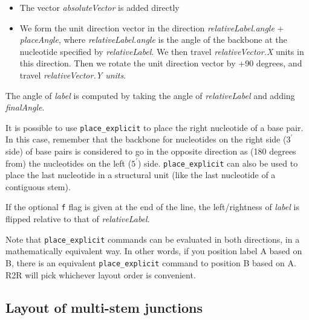 \documentclass[letterpaper,12pt]{report}
\newcommand{\comment}[1]{}
\begin{document}
\begin{itemize}
\item The vector \textit{absoluteVector} is added directly
\item We form the unit direction vector in the direction
\textit{relativeLabel.angle }+ \textit{placeAngle}, where
\textit{relativeLabel.angle }is the angle of the backbone at the
nucleotide specified by \textit{relativeLabel}.  We then travel
\textit{relativeVector.X} units in this direction.  Then we rotate the
unit direction vector by +90 degrees, and travel
\textit{relativeVector.Y units}.
\end{itemize}

The angle of \textit{label }is computed by taking the angle of
\textit{relativeLabel} and adding \textit{finalAngle}.

It is possible to use {\tt place\_explicit} to place the right nucleotide of a
base pair.  In this case, remember that the backbone for nucleotides on the right side
($3^\prime$ side) of base pairs is considered to go in the opposite direction as (180
degrees from) the nucleotides on the left ($5^\prime$) side.
{\tt place\_explicit} can also be used to place the last nucleotide in a
structural unit (like the last nucleotide of a contiguous stem).

If the optional {\tt f} flag is given at the end of the line, the
left/rightness of \textit{label} is flipped relative to that of {\it relativeLabel}.

Note that {\tt place\_explicit} commands can be evaluated in both directions,
in a mathematically equivalent way.  In other words, if you position label A based on B,
there is an equivalent {\tt place\_explicit} command to position B based on A.
R2R will pick whichever layout order is convenient.

\comment{
\subsubsection{Nudging points over a bit}
{\tt offset\_pt} \textit{label  relativeVector.X relativeVector.Y}

\begin{itemize}
\item[] adds the given X and Y coordinates to what would otherwise be
the coordinates of the point \textit{label}.
\end{itemize}
}
\subsection{Layout of multi-stem junctions}
\end{document}
